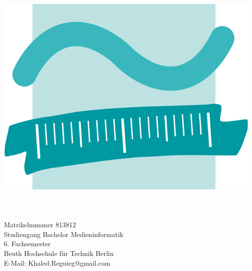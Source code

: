 \begin{titlepage}
	\tgherosfont
	\centering

	\includegraphics[width=0.5\linewidth]{figuren/Beuth} \\[2mm]
	{\small \thesisFirstReviewerDepartment}\\[5mm]
	\vfill
	{\LARGE \color{ctcolortitle}\textbf{\thesisSubject}}\\[10mm]
	
	{\large \thesisName} \\[5mm]
    {\normalsize Matrikelnummer 813812} \\
	{\normalsize Studiengang Bachelor Medieninformatik} \\
    {\normalsize 6. Fachsemester} \\
    {\normalsize Beuth Hochschule für Technik Berlin} \\
	{\small E-Mail: Khaled.Reguieg@gmail.com} \\
	

\end{titlepage}
